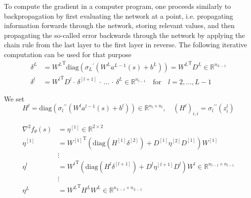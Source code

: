 To compute the gradient in a computer program, one proceeds similarly to backpropagation by first evaluating the network at a point, i.e. propagating information forwards through the network, storing relevant values, and then propagating the so-called error backwards through the network by applying the chain rule from the last layer to the first layer in reverse. The following iterative computation can be used for that purpose
\begin{align*}
    \delta^{L} & = {W^{L}}^{\mathrm{T}} \mathrm{diag}({\sigma_{L}}^{\prime}(W^{L} a^{L-1}(s) + b^{L})) = {W^{L}}^{\mathrm{T}} D^{L} \in \mathbb{R}^{n_{L-1}} \\
    \delta^{l} & = {W^{l}}^{\mathrm{T}} D^{l} \cdot \, \delta^{[l+1]} \, \cdot \, \ldots \,  \cdot \, \delta^{L} \in \mathbb{R}^{n_{l-1}} \quad \text{for} \quad l = 2, \ldots, L-1
\end{align*}


We set 
\begin{equation*}
    H^{l} = \mathrm{diag}({\sigma_{l}}^{\prime \prime}(W^{l} a^{l-1}(s) + b^{l})) \in \mathbb{R}^{n_l \times n_l}, \quad (H^{l})_{i, i} = {\sigma_{l}}^{\prime \prime} (z_{i}^{l})
\end{equation*}

\begin{align*}
    \nabla^{2} f_{\theta}(s) & = \eta^{[1]} \in \mathbb{R}^{2 \times 2} \\
    \eta^{[1]} & = {W^{[1]}}^{\mathrm{T}} \left( \mathrm{diag}(H^{[1]} \delta^{[2]}) + D^{[1]} \eta^{[2]} D^{[1]} \right) W^{[1]} \\
    & \vdots \\
    \eta^{l} & = {W^{l}}^{\mathrm{T}} \left( \mathrm{diag}(H^{l} \delta^{[l+1]}) + D^{l} \eta^{[l+1]} D^{l} \right) W^{l} \in \mathbb{R}^{n_{l-1} \times n_{l-1}} \\
    & \vdots \\
    \eta^{L} & = {W^{L}}^{\mathrm{T}} H^{L} W^{L} \in \mathbb{R}^{n_{L-1} \times n_{L-1}}
\end{align*} 


